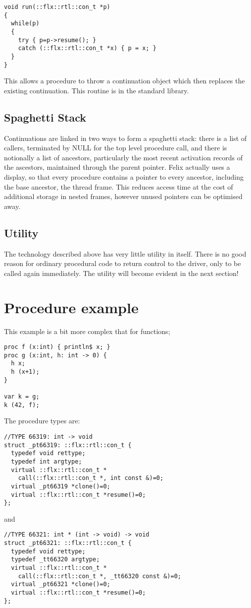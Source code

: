 \documentclass[oneside]{book}
\begin{document}
\begin{verbatim}
void run(::flx::rtl::con_t *p)
{
  while(p)
  {
    try { p=p->resume(); }
    catch (::flx::rtl::con_t *x) { p = x; }
  }
}
\end{verbatim}

This allows a procedure to throw a continuation object which then replaces
the existing continuation. This routine is in the standard library.

\subsection{Spaghetti Stack}
Continuations are linked in two ways to form a spaghetti stack: there is a list
of callers, terminated by NULL for the top level procedure call, and there
is notionally a list of ancestors, particularly the most recent activation records
of the ascestors, maintained through the parent pointer. Felix actually uses a display,
so that every procedure contains a pointer to every ancestor, including the base
ancestor, the thread frame. This reduces access time at the cost of additional storage
in nested frames, however unused pointers can be optimised away.

\subsection{Utility}
The technology described above has very little utility in itself. There is
no good reason for ordinary procedural code to return control to the driver,
only to be called again immediately. The utility will become evident in
the next section!

\section{Procedure example}
This example is a bit more complex that for functions;
\begin{verbatim}
proc f (x:int) { println$ x; }
proc g (x:int, h: int -> 0) {
  h x;
  h (x+1);
}

var k = g;
k (42, f);
\end{verbatim}

The procedure types are:
\begin{verbatim}
//TYPE 66319: int -> void
struct _pt66319: ::flx::rtl::con_t {
  typedef void rettype;
  typedef int argtype;
  virtual ::flx::rtl::con_t *
    call(::flx::rtl::con_t *, int const &)=0;
  virtual _pt66319 *clone()=0;
  virtual ::flx::rtl::con_t *resume()=0;
};
\end{verbatim}
and
\begin{verbatim}
//TYPE 66321: int * (int -> void) -> void
struct _pt66321: ::flx::rtl::con_t {
  typedef void rettype;
  typedef _tt66320 argtype;
  virtual ::flx::rtl::con_t *
    call(::flx::rtl::con_t *, _tt66320 const &)=0;
  virtual _pt66321 *clone()=0;
  virtual ::flx::rtl::con_t *resume()=0;
};
\end{verbatim}
\end{document}
